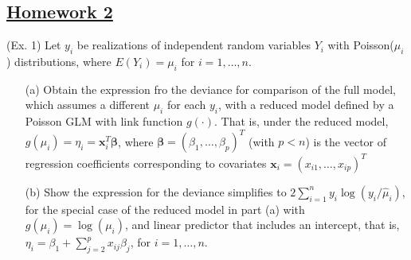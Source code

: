 \documentclass[]{article}
\begin{document}
\renewcommand{\headrulewidth}{0.4pt}
\renewcommand{\footrulewidth}{0.4pt}


\begin{center}
\section*{\underline{Homework 2}}
\end{center}

\begin{enumerate}  \Large{

\item (Ex. 1)
Let $y_i$ be realizations of independent random variables $Y_i$ with Poisson($\mu_i$) distributions, where $E(Y_i) = \mu_i$ for $i = 1,\ldots,n$.
\begin{itemize}
	\item[(a)] Obtain the expression fro the deviance for comparison of the full model, which assumes a different $\mu_i$ for each $y_i$, with a reduced model defined by a Poisson GLM with link function $g(\cdot)$. That is, under the reduced model, $g(\mu_i) = \eta_i = \bm{x}_i^T \bm{\beta}$, where $\bm{\beta} = (\beta_1,\ldots,\beta_p)^T$ (with $p<n$) is the vector of regression coefficients corresponding to covariates $\bm{x}_i = (x_{i1},\ldots,x_{ip})^T$ 
	\item[(b)] Show the expression for the deviance simplifies to $2\sum_{i=1}^{n}y_i\log(y_i/\hat{\mu}_i)$, for the special case of the reduced model in part (a) with $g(\mu_i) = \log(\mu_i)$, and linear predictor that includes an intercept, that is, $\eta_i = \beta_1 + \sum_{j=2}^{p}x_{ij}\beta_j$, for $i = 1,\ldots,n$.
\end{itemize}

}
\end{enumerate}
\end{document}
